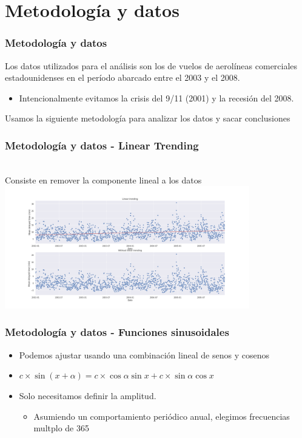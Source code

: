 \documentclass{beamer}
\begin{document}

\section{Metodología y datos}
\begin{frame}
\frametitle{Metodología y datos}
Los datos utilizados para el análisis son los de vuelos de aerolíneas comerciales estadounidenses en el período abarcado entre el 2003 y el 2008.
\begin{itemize}
\item Intencionalmente evitamos la crisis del 9/11 (2001) y la recesión del 2008.
\end{itemize}
Usamos la siguiente metodología para analizar los datos y sacar conclusiones
\end{frame}


\begin{frame}
\frametitle{Metodología y datos -  Linear Trending}
\\ Consiste en remover la componente lineal a los datos
  \centering
  \includegraphics[width=0.8\textwidth]{plots/linear_trending.png}
\end{frame}


\begin{frame}
\frametitle{Metodología y datos - Funciones sinusoidales}
	\begin{itemize}
		\item<1-> Podemos ajustar usando una combinaci\'on lineal de senos y cosenos
		\item<2-> $c \times \sin(x + \alpha) = c \times \cos \alpha \sin x + c \times \sin \alpha \cos x$
		\item<3-> Solo necesitamos definir la amplitud.
		\begin{itemize}
			\item<4-> Asumiendo un comportamiento peri\'odico anual, elegimos frecuencias multplo de 365
		\end{itemize}
	\end{itemize}
\end{frame}
\end{document}
